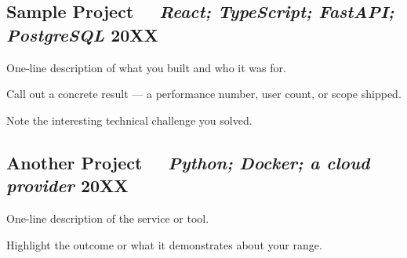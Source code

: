 \subsection{{\textbf{Sample Project} \textit{\ \ React; TypeScript; FastAPI; PostgreSQL} \hfill 20XX}}
\begin{zitemize}
\item One-line description of what you built and who it was for.
\item Call out a concrete result — a performance number, user count, or scope shipped.
\item Note the interesting technical challenge you solved.
\end{zitemize}

\subsection{{\textbf{Another Project} \textit{\ \ Python; Docker; a cloud provider} \hfill 20XX}}
\begin{zitemize}
\item One-line description of the service or tool.
\item Highlight the outcome or what it demonstrates about your range.
\end{zitemize}
